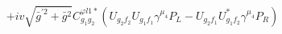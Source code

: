 %
\begin{dmath*}
%
  +  i v \sqrt{{\bar g}^{\prime 2} + {\bar g}{}^2}C^{ \varphi  l1*}_{g_1 g_2} \left(U_{g_2 f_2} U_{g_1 f_1} \gamma^{\mu_4} P_L - U_{g_2 f_1} U_{g_1 f_2}^* \gamma^{\mu_4} P_R\right)
%
\end{dmath*}
%
